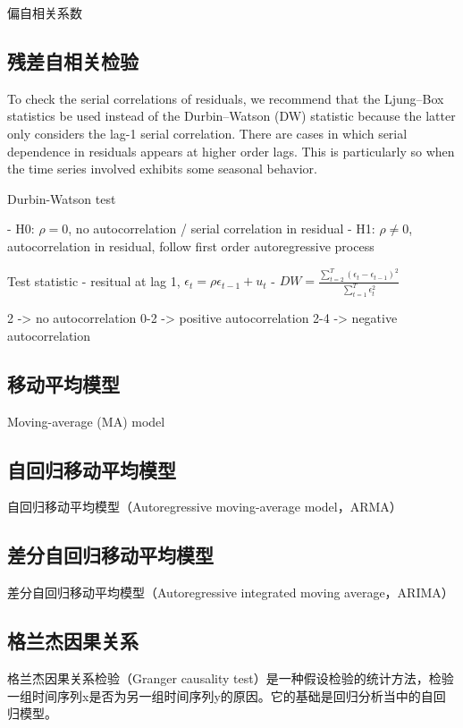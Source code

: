 \documentclass[11pt]{article}
\begin{document}
\divider


偏自相关系数


\subsection{残差自相关检验}

To check the serial correlations of residuals, we recommend that the Ljung–Box statistics be used instead of the Durbin–Watson (DW) statistic because the latter only considers the lag-1 serial correlation. There are cases in which serial dependence in residuals appears at higher order lags. This is particularly so when the time series involved exhibits some seasonal behavior.

Durbin-Watson test

- H0: $\rho = 0$, no autocorrelation / serial correlation in residual
- H1: $\rho \neq 0$, autocorrelation in residual, follow first order autoregressive process

Test statistic
- resitual at lag 1, $\epsilon_t = \rho \epsilon_{t-1} + u_t$
- $DW = \frac{\sum_{t=2}^{T} (\epsilon_t - \epsilon_{t-1})^2}{\sum_{t=1}^{T} \epsilon^2_t}$

2 -> no autocorrelation
0-2 -> positive autocorrelation
2-4 -> negative autocorrelation

\subsection{移动平均模型}

Moving-average (MA) model


\subsection{自回归移动平均模型}

自回归移动平均模型（Autoregressive moving-average model，ARMA）

\subsection{差分自回归移动平均模型}

差分自回归移动平均模型（Autoregressive integrated moving average，ARIMA）


\subsection{格兰杰因果关系}

格兰杰因果关系检验（Granger causality test）是一种假设检验的统计方法，检验一组时间序列x是否为另一组时间序列y的原因。它的基础是回归分析当中的自回归模型。
\end{document}
